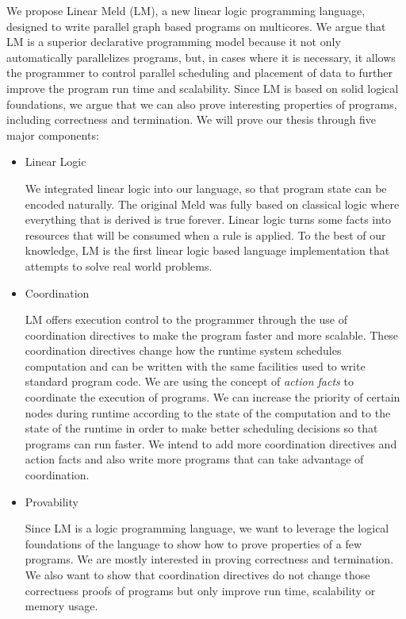 
We propose Linear Meld (LM), a new linear logic programming language, designed
to write parallel graph based programs on multicores.  We argue that LM is a
superior declarative programming model because it not only automatically
parallelizes programs, but, in cases where it is necessary, it allows the
programmer to control parallel scheduling and placement of data to further
improve the program run time and scalability.  Since LM is based on solid
logical foundations, we argue that we can also prove interesting properties of
programs, including correctness and termination. We will prove our thesis
through five major components:

\begin{itemize}
   
   \item Linear Logic

   We integrated linear logic into our language, so that program state can be
   encoded naturally. The original Meld was fully based on classical logic where
   everything that is derived is true forever. Linear logic turns some facts
   into resources that will be consumed when a rule is applied.  To the best of
   our knowledge, LM is the first linear logic based language implementation
   that attempts to solve real world problems.

   \item Coordination
   
   LM offers execution control to the programmer through the use of coordination
   directives to make the program faster and more scalable. These coordination
   directives change how the runtime system schedules computation and can be
   written with the same facilities used to write standard program code.  We are
   using the concept of \emph{action facts} to coordinate the execution of
   programs.  We can increase the priority of certain nodes during runtime
   according to the state of the computation and to the state of the runtime in
   order to make better scheduling decisions so that programs can run faster.
   We intend to add more coordination directives and action facts and also write
   more programs that can take advantage of coordination.
   
   \item Provability
   
   Since LM is a logic programming language, we want to leverage the logical
   foundations of the language to show how to prove properties of a few
   programs. We are mostly interested in proving correctness and termination.
   We also want to show that coordination directives do not change those
   correctness proofs of programs but only improve run time, scalability or
   memory usage.


\end{itemize}
